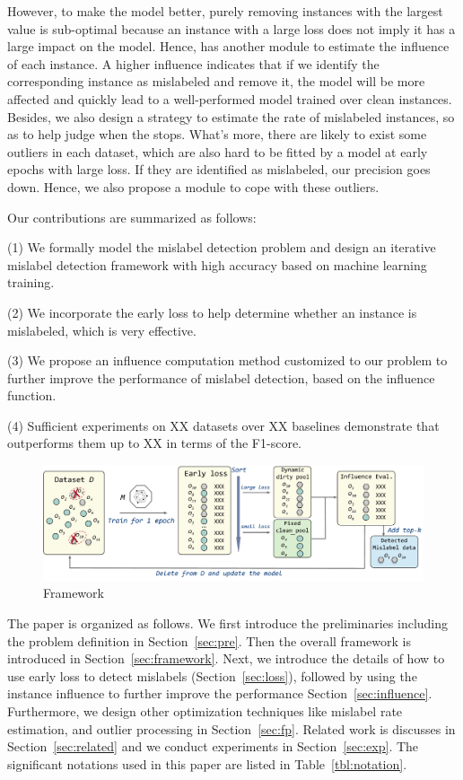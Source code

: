 However, to make the model better, purely removing instances with the largest value is sub-optimal because an instance with a large loss does not imply it has a large impact on the model. Hence, \sys has another module  to estimate the influence of each instance. A higher influence indicates that if we identify the corresponding instance as mislabeled and remove it, the model will be more affected and quickly lead to a well-performed model trained over clean instances. Besides, we also design a strategy to estimate the rate of mislabeled instances, so as to help judge when the \sys stops. What's more, there are likely to  exist some outliers in each dataset, which are also hard to be  fitted by a model at early epochs with large loss. If they are identified as mislabeled, our precision goes down. Hence, we also propose a module to cope with these outliers.


Our contributions are summarized as follows:

\noindent (1) We formally model the mislabel detection problem and  design an iterative mislabel detection framework \sys with high accuracy based on machine learning training.

\noindent (2) We incorporate the early loss to help determine whether an instance is mislabeled, which is very effective.

\noindent (3) We propose an influence computation method customized to our problem to further improve the performance of  mislabel detection, based on the influence function. 

\noindent (4) Sufficient experiments on XX datasets over XX baselines demonstrate that \sys outperforms them up to XX in terms of the F1-score.

\begin{figure}
	\centering
	\includegraphics[width=\textwidth]{figures/framework}
	\caption{\sys Framework}
	\label{fig:framework}
\end{figure}

The paper is organized as follows. We first introduce the preliminaries including the problem definition in Section~\ref{sec:pre}. Then the overall framework is introduced in  Section~\ref{sec:framework}. Next, we introduce the details of how to use early loss to detect mislabels (Section~\ref{sec:loss}), followed by using the instance influence to further improve the performance Section~\ref{sec:influence}. Furthermore, we design other optimization techniques like mislabel rate estimation, and outlier processing in Section~\ref{sec:fp}. Related work is discusses in Section~\ref{sec:related} and we conduct experiments in Section~\ref{sec:exp}. The significant notations used in this paper are listed in Table~\ref{tbl:notation}.


